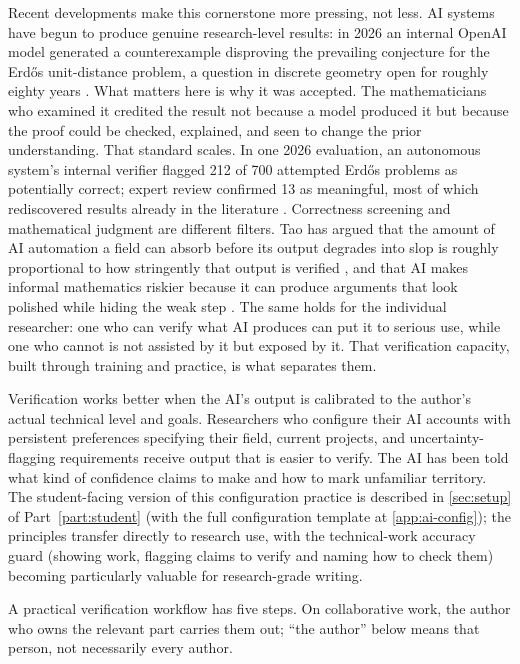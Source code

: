 \documentclass{SIAMbook2023}
\begin{document}
Recent developments make this cornerstone more pressing, not less. AI systems have begun to produce genuine research-level results: in 2026 an internal OpenAI model generated a counterexample disproving the prevailing conjecture for the Erd\H{o}s unit-distance problem, a question in discrete geometry open for roughly eighty years \citep{openai2026unit}. What matters here is why it was accepted. The mathematicians who examined it credited the result not because a model produced it but because the proof could be checked, explained, and seen to change the prior understanding. That standard scales. In one 2026 evaluation, an autonomous system's internal verifier flagged 212 of 700 attempted Erd\H{o}s problems as potentially correct; expert review confirmed 13 as meaningful, most of which rediscovered results already in the literature \citep{feng2026semiautonomous}. Correctness screening and mathematical judgment are different filters. Tao has argued that the amount of AI automation a field can absorb before its output degrades into slop is roughly proportional to how stringently that output is verified \citep{tao2026fireside}, and that AI makes informal mathematics riskier because it can produce arguments that look polished while hiding the weak step \citep{tao2025machine}. The same holds for the individual researcher: one who can verify what AI produces can put it to serious use, while one who cannot is not assisted by it but exposed by it. That verification capacity, built through training and practice, is what separates them.

Verification works better when the AI's output is calibrated to the author's actual technical level and goals. Researchers who configure their AI accounts with persistent preferences specifying their field, current projects, and uncertainty-flagging requirements receive output that is easier to verify. The AI has been told what kind of confidence claims to make and how to mark unfamiliar territory. The student-facing version of this configuration practice is described in \cref{sec:setup} of Part~\ref{part:student} (with the full configuration template at \cref{app:ai-config}); the principles transfer directly to research use, with the technical-work accuracy guard (showing work, flagging claims to verify and naming how to check them) becoming particularly valuable for research-grade writing.

A practical verification workflow has five steps. On collaborative work, the author who owns the relevant part carries them out; ``the author'' below means that person, not necessarily every author.
\end{document}
